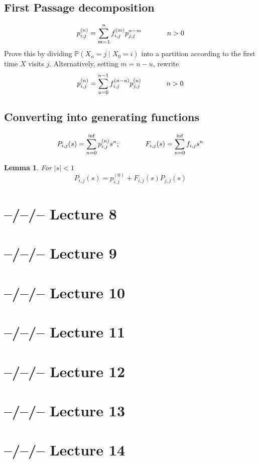 \documentclass{article}
\newtheorem{lem}[thm]{Lemma}
\theoremstyle{definition}
\newcommand{\PP}{\mathbb{P}}
\begin{document}
\subsection*{First Passage decomposition}
\[
p_{i,j}^{(n)} = \sum_{m=1}^n f_{i,j}^{(m)}p_{j,j}^{n-m} \hspace*{0.5 in} n > 0
\]
Prove this by dividing $\PP(X_n = j \mid X_0 = i)$ into a partition according to the first time $X$ visits $j$. Alternatively, setting $m = n - u$, rewrite
\[
p_{i,j}^{(n)} = \sum_{u = 0}^{n-1} f_{i,j}^{(n-u)}p_{j,j}^{(u)} \hspace*{0.5 in} n> 0
\]
\subsection*{Converting into generating functions}
\[
P_{i,j}(s) = \sum_{n=0}^{\inf} p_{i,j}^{(n)}s^n; \hspace*{0.5 in} F_{i,j}(s) = \sum_{n=0}^{\inf}f_{i,j}s^n
\]
\begin{lem} For $\mid s \mid < 1$
\[
P_{i,j}(s) = p_{i,j}^{(0)} + F_{i,j}(s)P_{j,j}(s)
\]
\end{lem}

\section{--/--/-- Lecture 8}

\section{--/--/-- Lecture 9}

\section{--/--/-- Lecture 10}

\section{--/--/-- Lecture 11}

\section{--/--/-- Lecture 12}

\section{--/--/-- Lecture 13}

\section{--/--/-- Lecture 14}
\end{document}
